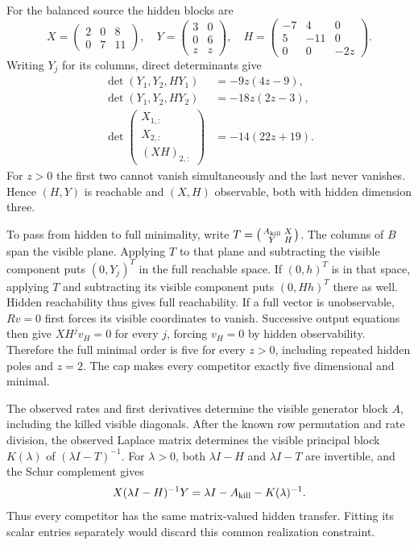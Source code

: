 For the balanced source the hidden blocks are
\begin{equation}
 X=\begin{pmatrix}2&0&8\\0&7&11\end{pmatrix},\quad
 Y=\begin{pmatrix}3&0\\0&6\\z&z\end{pmatrix},\quad
 H=\begin{pmatrix}-7&4&0\\5&-11&0\\0&0&-2z\end{pmatrix}.
 \label{eq:blocks}
\end{equation}
Writing $Y_j$ for its columns, direct determinants give
\begin{align}
 \det(Y_1,Y_2,HY_1)&=-9z(4z-9),\\
 \det(Y_1,Y_2,HY_2)&=-18z(2z-3),\\
 \det\begin{pmatrix}X_{1,:}\\X_{2,:}\\(XH)_{2,:}\end{pmatrix}
 &=-14(22z+19).
\end{align}
For $z>0$ the first two cannot vanish simultaneously and the last never
vanishes. Hence $(H,Y)$ is reachable and $(X,H)$ observable, both with
hidden dimension three.

To pass from hidden to full minimality, write
$T=\left(\begin{smallmatrix}A_{\rm kill}&X\\Y&H\end{smallmatrix}\right)$.
The columns of $B$ span the visible plane. Applying $T$ to that plane and
subtracting the visible component puts $(0,Y_j)^T$ in the full reachable
space. If $(0,h)^T$ is in that space, applying $T$ and subtracting its
visible component puts $(0,Hh)^T$ there as well. Hidden reachability thus
gives full reachability. If a full vector is unobservable, $Rv=0$ first
forces its visible coordinates to vanish. Successive output equations
then give $XH^jv_H=0$ for every $j$, forcing $v_H=0$ by hidden
observability. Therefore the full minimal order is five for every $z>0$,
including repeated hidden poles and $z=2$. The cap makes every competitor
exactly five dimensional and minimal.

The observed rates and first derivatives determine the visible generator
block $A$, including the killed visible diagonals. After the known row
permutation and rate division, the observed Laplace matrix determines
the visible principal block $K(\lambda)$ of $(\lambda I-T)^{-1}$. For
$\lambda>0$, both $\lambda I-H$ and $\lambda I-T$ are invertible, and
the Schur complement gives
\begin{equation}
 X(\lambda I-H)^{-1}Y
 =\lambda I-A_{\rm kill}-K(\lambda)^{-1}.\label{eq:htransfer}
\end{equation}
Thus every competitor has the same matrix-valued hidden transfer.
Fitting its scalar entries separately would discard this common
realization constraint.

